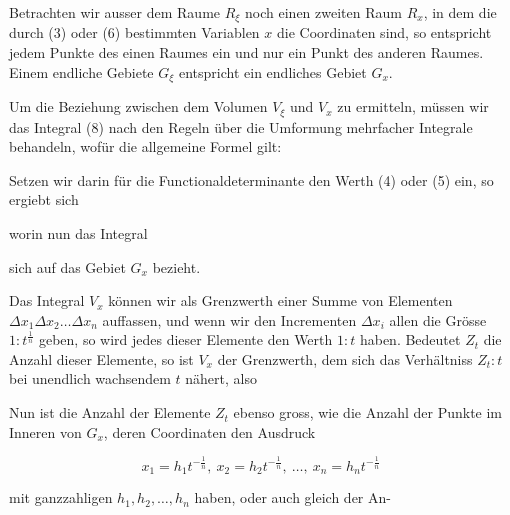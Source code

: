 Betrachten wir ausser dem Raume $R_\xi$ noch einen zweiten Raum $R_x$,
in dem die durch (3) oder (6) bestimmten Variablen $x$ die Coordinaten
sind, so entspricht jedem Punkte des einen Raumes ein und nur ein
Punkt des anderen Raumes. Einem endliche %
Gebiete $G_\xi$ entspricht ein endliches Gebiet $G_x$.

Um die Beziehung zwischen dem Volumen $V_\xi$ und $V_x$ zu ermitteln,
müssen wir das Integral (8) nach den Regeln über die Umformung
mehrfacher Integrale behandeln, wofür die allgemeine Formel gilt:



Setzen wir darin für die Functionaldeterminante den Werth (4) oder
(5) ein, so ergiebt sich


worin nun das Integral


sich auf das Gebiet $G_x$ bezieht.

Das Integral $V_x$ können wir als Grenzwerth einer Summe von
Elementen $\Delta x_1 \Delta x_2 \ldots \Delta x_n$ auffassen, und
wenn wir den Incrementen $\Delta x_i$ allen die Grösse $1 : t^{\frac1n}$
geben, so wird jedes dieser Elemente den Werth $1 : t$ haben.
Bedeutet $Z_t$ die Anzahl dieser Elemente, so ist $V_x$ der
Grenzwerth, dem sich das Verhältniss $Z_t : t$ bei unendlich
wachsendem $t$ nähert, also


Nun ist die Anzahl der Elemente $Z_t$ ebenso gross, wie die Anzahl
der Punkte im Inneren von $G_x$, deren Coordinaten den Ausdruck

\[
x_1 = h_1 t^{-\frac1n},\ x_2 = h_2 t^{-\frac1n},\ \ldots,\ x_n = h_n t^{-\frac1n}
\]

mit ganzzahligen $h_1, h_2, \ldots, h_n$ haben, oder auch gleich der An-
